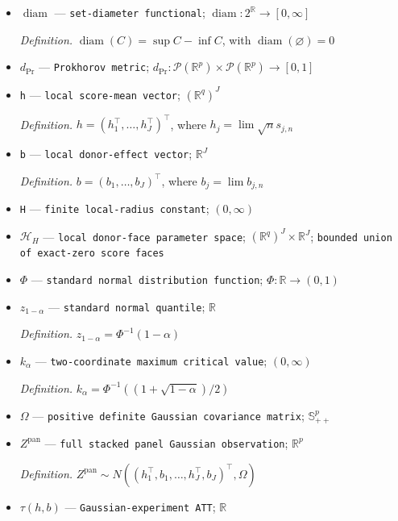 \documentclass{article}
\begin{document}
\begin{itemize}
  \item \(\operatorname{diam}\) --- \texttt{set-\allowbreak{}diameter functional}; \(\operatorname{diam}:2^{\mathbb R}\to[0,\infty]\)
  \par\smallskip\noindent\emph{Definition.} \(\operatorname{diam}(C)=\sup C-\inf C\), with \(\operatorname{diam}(\varnothing)=0\)
  \item \(d_{\mathrm{Pr}}\) --- \texttt{Prokhorov metric}; \(d_{\mathrm{Pr}}:\mathcal P(\mathbb R^p)\times\mathcal P(\mathbb R^p)\to[0,1]\)
  \item \texttt{h} --- \texttt{local score-\allowbreak{}mean vector}; \((\mathbb R^q)^J\)
  \par\smallskip\noindent\emph{Definition.} \(h=(h_1^{\top},\ldots,h_J^{\top})^{\top}\), where \(h_j=\lim\sqrt n s_{j,n}\)
  \item \texttt{b} --- \texttt{local donor-\allowbreak{}effect vector}; \(\mathbb R^J\)
  \par\smallskip\noindent\emph{Definition.} \(b=(b_1,\ldots,b_J)^{\top}\), where \(b_j=\lim b_{j,n}\)
  \item \texttt{H} --- \texttt{finite local-\allowbreak{}radius constant}; \((0,\infty)\)
  \item \(\mathcal H_H\) --- \texttt{local donor-\allowbreak{}face parameter space}; \((\mathbb R^q)^J\times\mathbb R^J\); \texttt{bounded union of exact-\allowbreak{}zero score faces}
  \item \(\Phi\) --- \texttt{standard normal distribution function}; \(\Phi:\mathbb R\to(0,1)\)
  \item \(z_{1-\alpha}\) --- \texttt{standard normal quantile}; \(\mathbb R\)
  \par\smallskip\noindent\emph{Definition.} \(z_{1-\alpha}=\Phi^{-1}(1-\alpha)\)
  \item \(k_{\alpha}\) --- \texttt{two-\allowbreak{}coordinate maximum critical value}; \((0,\infty)\)
  \par\smallskip\noindent\emph{Definition.} \(k_{\alpha}=\Phi^{-1}((1+\sqrt{1-\alpha})/2)\)
  \item \(\Omega\) --- \texttt{positive definite Gaussian covariance matrix}; \(\mathbb S_{++}^p\)
  \item \(Z^{\mathrm{pan}}\) --- \texttt{full stacked panel Gaussian observation}; \(\mathbb R^p\)
  \par\smallskip\noindent\emph{Definition.} \(Z^{\mathrm{pan}}\sim N((h_1^{\top},b_1,\ldots,h_J^{\top},b_J)^{\top},\Omega)\)
  \item \(\tau(h,b)\) --- \texttt{Gaussian-\allowbreak{}experiment ATT}; \(\mathbb R\)

\end{itemize}
\end{document}
